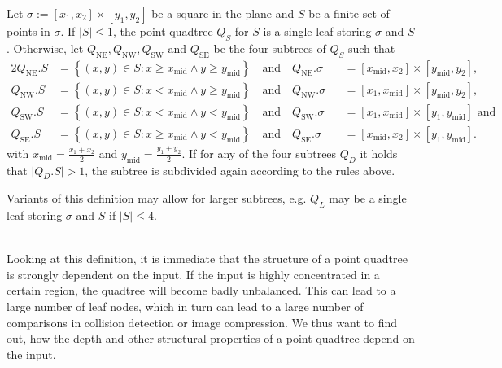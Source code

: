     \begin{definition} 
        Let $\sigma := [x_1, x_2] \times [y_1, y_2]$ be a square in the plane and $S$ be a finite set of points in $\sigma$. If $\vert S \vert \leq 1$, the point quadtree $Q_S$ for $S$ is a single leaf storing $\sigma$ and $S$. Otherwise, let $Q_{\text{NE}}, Q_{\text{NW}}, Q_{\text{SW}}$ and $Q_{\text{SE}}$ be the four subtrees of $Q_S$ such that 
        \begin{alignat*}{2}
            Q_{\text{NE}}.S &= \left\{ (x, y) \in S : x \geq x_\text{mid} \land y \geq y_\text{mid} \right\} \quad\!\text{and}\quad Q_{\text{NE}}.\sigma &&= \left[ x_\text{mid}, x_2 \right] \times \left[ y_\text{mid}, y_2 \right], \\
            Q_{\text{NW}}.S &= \left\{ (x, y) \in S : x < x_\text{mid} \land y \geq y_\text{mid} \right\} \quad\!\text{and}\quad Q_{\text{NW}}.\sigma &&= \left[ x_1, x_\text{mid} \right] \times \left[ y_\text{mid}, y_2 \right], \\
            Q_{\text{SW}}.S &= \left\{ (x, y) \in S : x < x_\text{mid} \land y < y_\text{mid} \right\} \quad\!\text{and}\quad Q_{\text{SW}}.\sigma &&= \left[ x_1, x_\text{mid} \right] \times \left[ y_1, y_\text{mid} \right] \text{ and} \\
            Q_{\text{SE}}.S &= \left\{ (x, y) \in S : x \geq x_\text{mid} \land y < y_\text{mid} \right\} \quad\!\text{and}\quad Q_{\text{SE}}.\sigma &&= \left[ x_\text{mid}, x_2 \right] \times \left[ y_1, y_\text{mid} \right]. 
        \end{alignat*}
        with $x_\text{mid} = \frac{x_1 + x_2}{2}$ and $y_\text{mid} = \frac{y_1 + y_2}{2}$. If for any of the four subtrees $Q_D$ it holds that $\vert Q_D.S \vert > 1$, the subtree is subdivided again according to the rules above. 
    \end{definition}

    \begin{remark} 
        Variants of this definition may allow for larger subtrees, e.g. $Q_L$ may be a single leaf storing $\sigma$ and $S$ if $\vert S \vert \leq 4$.
    \end{remark} \ \\

    Looking at this definition, it is immediate that the structure of a point quadtree is strongly dependent on the input. If the input is highly concentrated in a certain region, the quadtree will become badly unbalanced. This can lead to a large number of leaf nodes, which in turn can lead to a large number of comparisons in collision detection or image compression. We thus want to find out, how the depth and other structural properties of a point quadtree depend on the input. 

